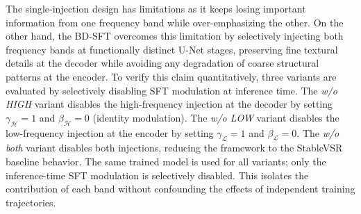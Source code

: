 The single-injection design has limitations as it keeps losing 
important information from one frequency band while 
over-emphasizing the other. On the other hand, the BD-SFT 
overcomes this limitation by selectively injecting both 
frequency bands at functionally distinct U-Net stages, 
preserving fine textural details at the decoder while 
avoiding any degradation of coarse structural patterns at the 
encoder. To verify this claim quantitatively, three variants 
are evaluated by selectively disabling SFT modulation at 
inference time. The \textit{w/o HIGH} variant disables the 
high-frequency injection at the decoder by setting 
$\gamma_{\mathcal{H}} = 1$ and $\beta_{\mathcal{H}} = 0$ 
(identity modulation). The \textit{w/o LOW} variant disables 
the low-frequency injection at the encoder by setting 
$\gamma_{\mathcal{L}} = 1$ and $\beta_{\mathcal{L}} = 0$. The 
\textit{w/o both} variant disables both injections, reducing 
the framework to the StableVSR baseline behavior. The same 
trained model is used for all variants; only the 
inference-time SFT modulation is selectively disabled. This 
isolates the contribution of each band without confounding 
the effects of independent training trajectories.

\begin{table}[htbp]
\caption{Ablation study on frequency band injection (REDS4).}
\centering
{}
\label{tab:ablation_band}
\end{table}

